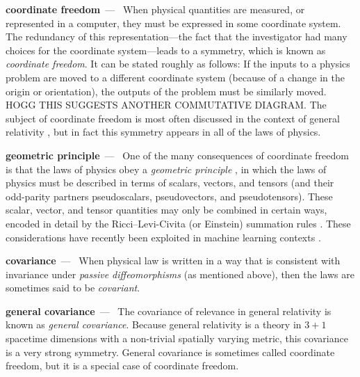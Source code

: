 \documentclass{article}
\renewcommand{\paragraph}[1]{\par\textbf{#1}~---~}
\begin{document}
\paragraph{coordinate freedom}
When physical quantities are measured, or represented in a computer, they must be expressed in some coordinate system.
The redundancy of this representation---the fact that the investigator had many choices for the coordinate system---leads to a symmetry, which is known as \emph{coordinate freedom}.
It can be stated roughly as follows:
If the inputs to a physics problem are moved to a different coordinate system (because of a change in the origin or orientation), the outputs of the problem must be similarly moved.
HOGG THIS SUGGESTS ANOTHER COMMUTATIVE DIAGRAM.
The subject of coordinate freedom is most often discussed in the context of general relativity \cite{gr}, but in fact this symmetry appears in all of the laws of physics.

\paragraph{geometric principle}
One of the many consequences of coordinate freedom is that the laws of physics obey a \emph{geometric principle} \cite{mcp}, in which the laws of physics must be described in terms of scalars, vectors, and tensors (and their odd-parity partners pseudoscalars, pseudovectors, and pseudotensors).
These scalar, vector, and tensor quantities may only be combined in certain ways, encoded in detail by the Ricci--Levi-Civita (or Einstein) summation rules \cite{ricci, einsteinsummation}.
These considerations have recently been exploited in machine learning contexts \cite{villar2021scalars}.

\paragraph{covariance}
When physical law is written in a way that is consistent with invariance under \emph{passive diffeomorphisms} (as mentioned above), then the laws are sometimes said to be \emph{covariant}.

\paragraph{general covariance}
The covariance of relevance in general relativity \cite{einstein} is known as \emph{general covariance}.
Because general relativity is a theory in $3+1$ spacetime dimensions with a non-trivial spatially varying metric, this covariance is a very strong symmetry.
General covariance is sometimes called coordinate freedom, but it is a special case of coordinate freedom.
\end{document}
